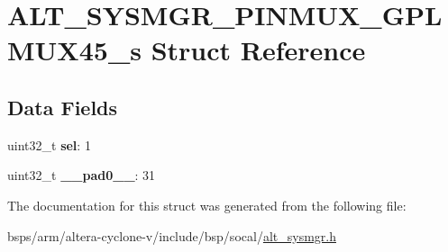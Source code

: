 \hypertarget{structALT__SYSMGR__PINMUX__GPLMUX45__s}{}\section{A\+L\+T\+\_\+\+S\+Y\+S\+M\+G\+R\+\_\+\+P\+I\+N\+M\+U\+X\+\_\+\+G\+P\+L\+M\+U\+X45\+\_\+s Struct Reference}
\label{structALT__SYSMGR__PINMUX__GPLMUX45__s}
\subsection*{Data Fields}
\begin{DoxyCompactItemize}
\item 
\mbox{\label{structALT__SYSMGR__PINMUX__GPLMUX45__s_adb2e12fa7459bb67369bc416272b98c0}} 
uint32\+\_\+t {\bfseries sel}\+: 1
\item 
\mbox{\label{structALT__SYSMGR__PINMUX__GPLMUX45__s_a33fb69f6e4b27f4ff9ada4cf4f295188}} 
uint32\+\_\+t {\bfseries \+\_\+\+\_\+pad0\+\_\+\+\_\+}\+: 31
\end{DoxyCompactItemize}


The documentation for this struct was generated from the following file\+:\begin{DoxyCompactItemize}
\item 
bsps/arm/altera-\/cyclone-\/v/include/bsp/socal/\mbox{\hyperlink{alt__sysmgr_8h}{alt\+\_\+sysmgr.\+h}}\end{DoxyCompactItemize}
